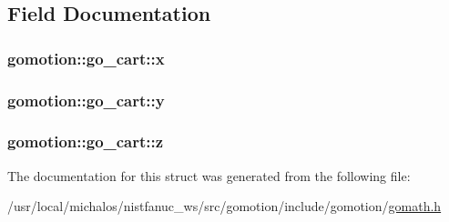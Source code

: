 \subsection{Field Documentation}
\hypertarget{structgomotion_1_1go__cart_aeeef43b72f7d3ac6f9ca46de289327ad}{
\subsubsection[{x}]{ gomotion\-::go\-\_\-cart\-::x}}\label{structgomotion_1_1go__cart_aeeef43b72f7d3ac6f9ca46de289327ad}
\hypertarget{structgomotion_1_1go__cart_a7c3bd01f32befc6fa53341024662756a}{
\subsubsection[{y}]{ gomotion\-::go\-\_\-cart\-::y}}\label{structgomotion_1_1go__cart_a7c3bd01f32befc6fa53341024662756a}
\hypertarget{structgomotion_1_1go__cart_ab3336b4fb8a6bfa18f55c0558fd5d299}{
\subsubsection[{z}]{ gomotion\-::go\-\_\-cart\-::z}}\label{structgomotion_1_1go__cart_ab3336b4fb8a6bfa18f55c0558fd5d299}


The documentation for this struct was generated from the following file\-:\begin{DoxyCompactItemize}
\item 
/usr/local/michalos/nistfanuc\-\_\-ws/src/gomotion/include/gomotion/\hyperlink{gomath_8h}{gomath.\-h}\end{DoxyCompactItemize}
